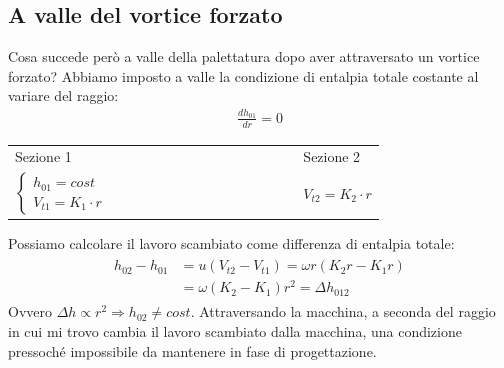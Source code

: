 \subsection{A valle del vortice forzato}
Cosa succede però a valle della palettatura dopo aver attraversato un vortice forzato? 
Abbiamo imposto a valle la condizione di entalpia totale costante al variare del raggio:
\begin{align*}
\frac{dh_{01}}{dr} = 0
\end{align*}
\begin{center}
\begin{tabular}{l l l l l l l l l l l l l l l}
	Sezione 1 & & & & & & & & & & & & & & Sezione 2\\
	$
	\begin{cases}
		h_{01} = cost\\
		V_{t1} = K_1 \cdot r
	\end{cases}$ & & & & & & & & & & & & & & $V_{t2} = K_2 \cdot r$
\end{tabular}
\end{center}
Possiamo calcolare il lavoro scambiato come differenza di entalpia totale:
\begin{align*}
\begin{split}
h_{02} - h_{01} &= u (V_{t2} - V_{t1} ) = \omega r (K_2 r - K_1 r) \\
&= \omega (K_2 - K_1) r^2 = \Delta h_{012}
\end{split}
\end{align*}
Ovvero $\Delta h \propto r^2 \Rightarrow h_{02} \neq  cost$. Attraversando la macchina, a seconda del raggio in cui mi trovo cambia il lavoro scambiato dalla macchina, una condizione pressoché impossibile da mantenere in fase di progettazione.


